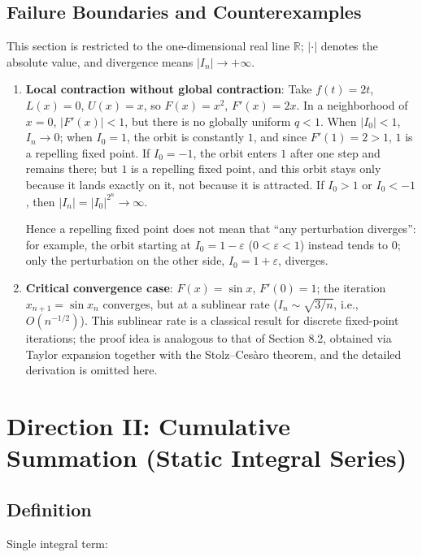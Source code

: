 \documentclass[11pt,a4paper]{amsart}
\begin{document}
\subsection{Failure Boundaries and Counterexamples}

This section is restricted to the one-dimensional real line $\mathbb{R}$; $|\cdot|$ denotes the absolute value, and divergence means $|I_n| \to +\infty$.

\begin{enumerate}
\item \textbf{Local contraction without global contraction}: Take $f(t) = 2t$, $L(x) = 0$, $U(x) = x$, so $F(x) = x^2$, $F'(x) = 2x$. In a neighborhood of $x = 0$, $|F'(x)| < 1$, but there is no globally uniform $q < 1$. When $|I_0| < 1$, $I_n \to 0$; when $I_0 = 1$, the orbit is constantly $1$, and since $F'(1) = 2 > 1$, $1$ is a repelling fixed point. If $I_0 = -1$, the orbit enters $1$ after one step and remains there; but $1$ is a repelling fixed point, and this orbit stays only because it lands exactly on it, not because it is attracted. If $I_0 > 1$ or $I_0 < -1$, then $|I_n| = |I_0|^{2^n} \to \infty$.

Hence a repelling fixed point does not mean that ``any perturbation diverges'': for example, the orbit starting at $I_0 = 1-\varepsilon$ ($0 < \varepsilon < 1$) instead tends to $0$; only the perturbation on the other side, $I_0 = 1+\varepsilon$, diverges.

\item \textbf{Critical convergence case}: $F(x) = \sin x$, $F'(0) = 1$; the iteration $x_{n+1} = \sin x_n$ converges, but at a sublinear rate ($I_n \sim \sqrt{3/n}$, i.e., $O(n^{-1/2})$). This sublinear rate is a classical result for discrete fixed-point iterations; the proof idea is analogous to that of Section 8.2, obtained via Taylor expansion together with the Stolz--Ces\`{a}ro theorem, and the detailed derivation is omitted here.
\end{enumerate}

\section{Direction II: Cumulative Summation (Static Integral Series)}

\subsection{Definition}

Single integral term:
\end{document}
